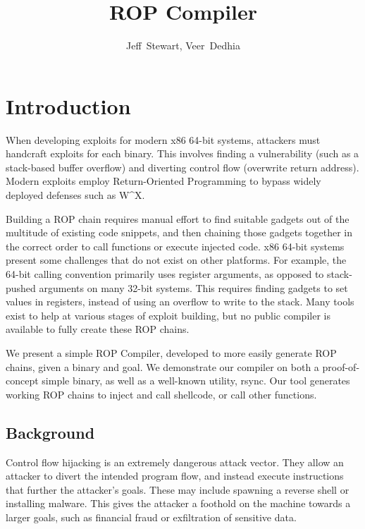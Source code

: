 \documentclass[journal]{IEEEtran}
\begin{document}
%
\title{ROP Compiler}

\author{Jeff~Stewart,
        Veer~Dedhia}



\maketitle

\section{Introduction}

When developing exploits for modern x86 64-bit systems, attackers must handcraft
exploits for each binary. This involves finding a vulnerability (such
as a stack-based buffer overflow) and diverting control flow (overwrite return
address). Modern exploits employ Return-Oriented Programming to bypass widely
deployed defenses such as W\^{}X.

Building a ROP chain requires manual effort to find suitable gadgets out of the
multitude of existing code snippets, and then chaining those gadgets together in
the correct order to call functions or execute injected code. x86 64-bit systems
present some challenges that do not exist on other platforms. For example, the
64-bit calling convention primarily uses register arguments, as opposed to
stack-pushed arguments on many 32-bit systems. This requires finding gadgets to
set values in registers, instead of using an overflow to write to the stack.
Many tools exist to help at various stages of exploit building, but no public
compiler is available to fully create these ROP chains.

We present a simple ROP Compiler, developed to more easily generate ROP chains,
given a binary and goal. We demonstrate our compiler on both a proof-of-concept
simple binary, as well as a well-known utility, rsync. Our tool generates
working ROP chains to inject and call shellcode, or call other functions.

\subsection{Background}
Control flow hijacking is an extremely dangerous attack vector. They allow an
attacker to divert the intended program flow, and instead execute instructions
that further the attacker's goals. These may include spawning a reverse shell or
installing malware. This gives the attacker a foothold on the machine towards a
larger goals, such as financial fraud or exfiltration of sensitive data.
\end{document}
